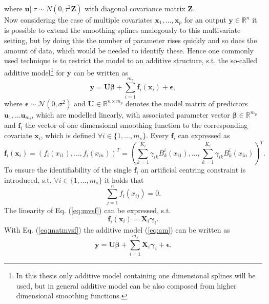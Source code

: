 \documentclass[12pt,letterpaper]{article}
\numberwithin{equation}{subsection}
\begin{document}
where $\mathbf{u}|\;\tau \sim N(0,\tau^2 \mathbf{Z})$ with diagonal covariance matrix $\mathbf{Z}$. \\
Now considering the case of multiple covariates $\mathbf{x}_1, \dots , \mathbf{x}_p$ for an output $\mathbf{y} \in \mathbb{R}^n$ it is possible to extend the smoothing splines analogously to this multivariate setting, but by doing this the number of parameter rises quickly and so does the amount of data, which would be needed to identify these. Hence one commonly used technique is to restrict the model to an additive structure, s.t. the so-called additive model\footnote{In this thesis only additive model containing one dimensional splines will be used, but in general additive model can be also composed from higher dimensional smoothing functions.} for $\mathbf{y}$ can be written as
\begin{equation}
\mathbf{y} = \mathbf{U}\mathbf{\beta} +  \sum^{m_s}_{i=1} \mathbf{f}_i(\mathbf{x}_i) + \mathbf{\epsilon},
\label{eq:am}
\end{equation}
where $\mathbf{\epsilon} \sim \mathcal{N}(0, \sigma^2)$ and $\mathbf{U}\in \mathbb{R}^{n\times m_{p}} $ denotes the model matrix of predictors $\mathbf{u}_1,\dots\mathbf{u}_{m_l}$, which are modelled linearly, with associated parameter vector $\mathbf{\beta} \in \mathbb{R}^{ m_{p}}$ and $\mathbf{f}_i$ the vector of one dimensional smoothing function to the corresponding covariate $\mathbf{x}_i$, which is defined $\forall i \in \{1,\dots ,m_{s}\}$. Every $\mathbf{f}_i$ can expressed as 
\begin{equation}
\mathbf{f}_i(\mathbf{x}_i) = (f_i(x_{i1}),\dots,f_i(x_{in}))^T = (\sum^{K_i}_{k=1}\gamma_{ik} B^i_k(x_{i1}),\dots,\sum^{K_i}_{k=1}\gamma_{ik} B^i_k(x_{in}))^T.
\label{eq:mvsf}
\end{equation}
To ensure the identifiability of the single $\mathbf{f}_i$ an artificial centring constraint is introduced, s.t. $\forall i \in \{1,\dots ,m_{s}\}$ it holds that
\begin{equation}
\sum^n_{j=1}f_i(x_{ij}) = 0.
\end{equation}  
The linearity of Eq. (\ref{eq:mvsf}) can be expressed, s.t. 
\begin{equation}
\mathbf{f}_i(\mathbf{x}_i) = \mathbf{X}_i\mathbf{\gamma}_i.
\label{eq:matmvsf}
\end{equation}
With Eq. (\ref{eq:matmvsf}) the additive model (\ref{eq:am}) can be written as
\begin{equation}
\mathbf{y} = \mathbf{U}\mathbf{\beta} +  \sum^{m_s}_{i=1} \mathbf{X}_i\mathbf{\gamma}_i + \mathbf{\epsilon}.
\label{eq:matam}
\end{equation}
\end{document}
